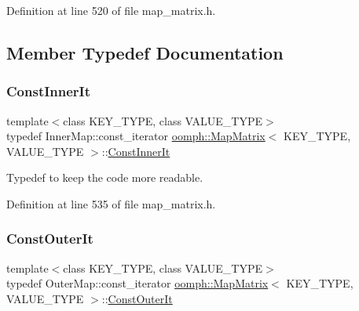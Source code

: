 Definition at line 520 of file map\+\_\+matrix.\+h.



\subsection{Member Typedef Documentation}
\mbox{\label{classoomph_1_1MapMatrix_ac3738b797386c7ad5dbe170d3558ace9}} 
\subsubsection{\texorpdfstring{Const\+Inner\+It}{ConstInnerIt}}
{\footnotesize\ttfamily template$<$class K\+E\+Y\+\_\+\+T\+Y\+PE, class V\+A\+L\+U\+E\+\_\+\+T\+Y\+PE$>$ \\
typedef Inner\+Map\+::const\+\_\+iterator \hyperlink{classoomph_1_1MapMatrix}{oomph\+::\+Map\+Matrix}$<$ K\+E\+Y\+\_\+\+T\+Y\+PE, V\+A\+L\+U\+E\+\_\+\+T\+Y\+PE $>$\+::\hyperlink{classoomph_1_1MapMatrix_ac3738b797386c7ad5dbe170d3558ace9}{Const\+Inner\+It}}



Typedef to keep the code more readable. 



Definition at line 535 of file map\+\_\+matrix.\+h.

\mbox{\label{classoomph_1_1MapMatrix_a795543d1b91f719b845b7588f7644eb3}} 
\subsubsection{\texorpdfstring{Const\+Outer\+It}{ConstOuterIt}}
{\footnotesize\ttfamily template$<$class K\+E\+Y\+\_\+\+T\+Y\+PE, class V\+A\+L\+U\+E\+\_\+\+T\+Y\+PE$>$ \\
typedef Outer\+Map\+::const\+\_\+iterator \hyperlink{classoomph_1_1MapMatrix}{oomph\+::\+Map\+Matrix}$<$ K\+E\+Y\+\_\+\+T\+Y\+PE, V\+A\+L\+U\+E\+\_\+\+T\+Y\+PE $>$\+::\hyperlink{classoomph_1_1MapMatrix_a795543d1b91f719b845b7588f7644eb3}{Const\+Outer\+It}}



